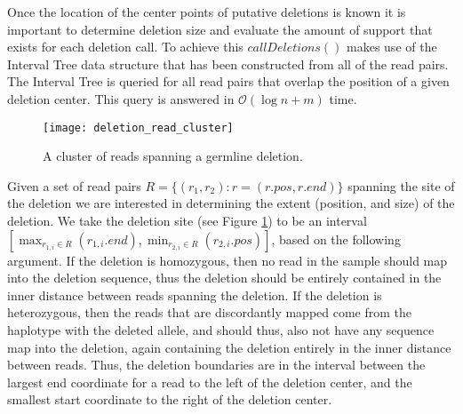 Once the location of the center points of putative deletions is known it is important to determine deletion size and evaluate the amount of support that exists for each deletion call. To achieve this $callDeletions()$ makes use of the Interval Tree data structure that has been constructed from all of the read pairs. The Interval Tree is queried for all read pairs that overlap the position of a given deletion center. This query is answered in $\mathcal{O}(\log{}n + m)$ time. 

\begin{figure}[H]
    \texttt{[image: deletion\_read\_cluster]}
    \centering
    \caption {A cluster of reads spanning a germline deletion.}
    \label{fig:deletion_read_cluster}
\end{figure}

Given a set of read pairs $R = \{(r_1,r_2) : r=(r.pos, r.end)\}$ spanning the site of the deletion we are interested in determining the extent (position, and size) of the deletion. We take the deletion site (see Figure \ref{fig:deletion_read_cluster}) to be an interval $[\max_{r_{1,i} \in R}{(r_{1,i}.end)}, \min_{r_{2,i} \in R}{(r_{2,i}.pos)}]$, based on the following argument. If the deletion is homozygous, then no read in the sample should map into the deletion sequence, thus the deletion should be entirely contained in the inner distance between reads spanning the deletion. If the deletion is heterozygous, then the reads that are discordantly mapped come from the haplotype with the deleted allele, and should thus, also not have any sequence map into the deletion, again containing the deletion entirely in the inner distance between reads. Thus, the deletion boundaries are in the interval between the largest end coordinate for a read to the left of the deletion center, and the smallest start coordinate to the right of the deletion center.

